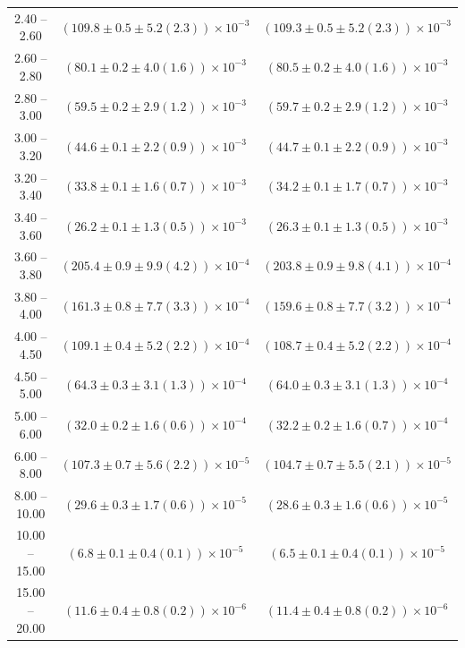 \begin{table}
\begin{center}
\begin{tabular}{ c | c c }
2.40 -- 2.60 & $(109.8\pm0.5\pm5.2(2.3))\times10^{-3}$ & $(109.3\pm0.5\pm5.2(2.3))\times10^{-3}$ \\ 
2.60 -- 2.80 & $(80.1\pm0.2\pm4.0(1.6))\times10^{-3}$ & $(80.5\pm0.2\pm4.0(1.6))\times10^{-3}$ \\ 
2.80 -- 3.00 & $(59.5\pm0.2\pm2.9(1.2))\times10^{-3}$ & $(59.7\pm0.2\pm2.9(1.2))\times10^{-3}$ \\ 
3.00 -- 3.20 & $(44.6\pm0.1\pm2.2(0.9))\times10^{-3}$ & $(44.7\pm0.1\pm2.2(0.9))\times10^{-3}$ \\ 
3.20 -- 3.40 & $(33.8\pm0.1\pm1.6(0.7))\times10^{-3}$ & $(34.2\pm0.1\pm1.7(0.7))\times10^{-3}$ \\ 
3.40 -- 3.60 & $(26.2\pm0.1\pm1.3(0.5))\times10^{-3}$ & $(26.3\pm0.1\pm1.3(0.5))\times10^{-3}$ \\ 
3.60 -- 3.80 & $(205.4\pm0.9\pm9.9(4.2))\times10^{-4}$ & $(203.8\pm0.9\pm9.8(4.1))\times10^{-4}$ \\ 
3.80 -- 4.00 & $(161.3\pm0.8\pm7.7(3.3))\times10^{-4}$ & $(159.6\pm0.8\pm7.7(3.2))\times10^{-4}$ \\ 
4.00 -- 4.50 & $(109.1\pm0.4\pm5.2(2.2))\times10^{-4}$ & $(108.7\pm0.4\pm5.2(2.2))\times10^{-4}$ \\ 
4.50 -- 5.00 & $(64.3\pm0.3\pm3.1(1.3))\times10^{-4}$ & $(64.0\pm0.3\pm3.1(1.3))\times10^{-4}$ \\ 
5.00 -- 6.00 & $(32.0\pm0.2\pm1.6(0.6))\times10^{-4}$ & $(32.2\pm0.2\pm1.6(0.7))\times10^{-4}$ \\ 
6.00 -- 8.00 & $(107.3\pm0.7\pm5.6(2.2))\times10^{-5}$ & $(104.7\pm0.7\pm5.5(2.1))\times10^{-5}$ \\ 
8.00 -- 10.00 & $(29.6\pm0.3\pm1.7(0.6))\times10^{-5}$ & $(28.6\pm0.3\pm1.6(0.6))\times10^{-5}$ \\ 
10.00 -- 15.00 & $(6.8\pm0.1\pm0.4(0.1))\times10^{-5}$ & $(6.5\pm0.1\pm0.4(0.1))\times10^{-5}$ \\ 
15.00 -- 20.00 & $(11.6\pm0.4\pm0.8(0.2))\times10^{-6}$ & $(11.4\pm0.4\pm0.8(0.2))\times10^{-6}$ \\ 
\hline
\end{tabular}
\end{center}
\end{table}
 
